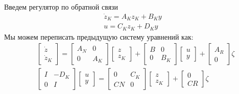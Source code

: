 Введем регулятор по обратной связи
\begin{align}
	\dot{{z}}_K = {A}_K {z}_K + {B}_K {y}\\
	{u} = {C}_K {z}_K + {D}_K {y}
\end{align}
Мы можем переписать предыдущую систему уравнений как:
\begin{align}
	&\begin{bmatrix}
		{\dot{z}} \\ {\dot{z}}_K
	\end{bmatrix}
	=
	\begin{bmatrix}
	{A}_N & 0 \\
		0 & {A}_K
	\end{bmatrix}
	\begin{bmatrix}
		{z} \\ {z}_K 
	\end{bmatrix}
	+
	\begin{bmatrix}
		{B} & 0 \\
		0 & {B}_K 
	\end{bmatrix}
	\begin{bmatrix}
		{u} \\ {y}
	\end{bmatrix}
	+
	\begin{bmatrix}
		{A}_R \\ 0 
	\end{bmatrix}
	\zeta
	\\
	& \begin{bmatrix}
		{I} & -{D}_K \\
		0 & {I}
	\end{bmatrix}
	\begin{bmatrix}
		{u} \\ {y}
	\end{bmatrix}
	=
	\begin{bmatrix}
		0 & {C}_K \\
		{C} {N} & 0
	\end{bmatrix}
	\begin{bmatrix}
		{z} \\ {z}_K
	\end{bmatrix}
	+
	\begin{bmatrix}
		0 \\ {C} {R}
	\end{bmatrix}{\zeta}
\end{align}

